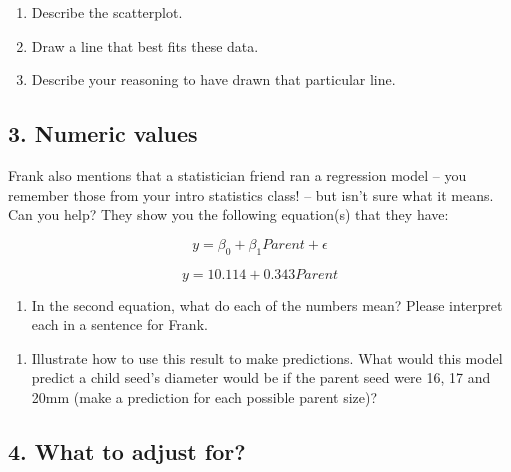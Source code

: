 \documentclass[]{article}
\providecommand{\tightlist}{%
  \setlength{\itemsep}{0pt}\setlength{\parskip}{0pt}}
\begin{document}
\begin{enumerate}
\def\labelenumi{\arabic{enumi}.}
\item
  Describe the scatterplot. \vspace{2in}
\item
  Draw a line that best fits these data.
\item
  Describe your reasoning to have drawn that particular line.
  \vspace{1in}
\end{enumerate}

\newpage

\hypertarget{numeric-values}{%
\subsection{3. Numeric values}\label{numeric-values}}

Frank also mentions that a statistician friend ran a regression model --
you remember those from your intro statistics class! -- but isn't sure
what it means. Can you help? They show you the following equation(s)
that they have:

\[ y = \beta_0 + \beta_1Parent + \epsilon \]

\[ y= 10.114 + 0.343Parent \]

\begin{enumerate}
\def\labelenumi{\arabic{enumi}.}
\tightlist
\item
  In the second equation, what do each of the numbers mean? Please
  interpret each in a sentence for Frank.
\end{enumerate}

\vspace{1in}

\begin{enumerate}
\def\labelenumi{\arabic{enumi}.}
\tightlist
\item
  Illustrate how to use this result to make predictions. What would this
  model predict a child seed's diameter would be if the parent seed were
  16, 17 and 20mm (make a prediction for each possible parent size)?
\end{enumerate}

\vspace{2.5in}

\hypertarget{what-to-adjust-for}{%
\subsection{4. What to adjust for?}\label{what-to-adjust-for}}
\end{document}
